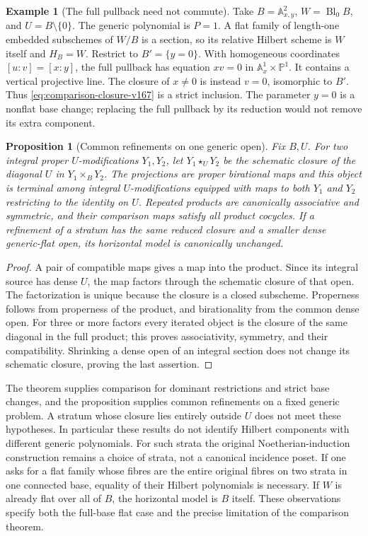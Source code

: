 \documentclass[11pt,reqno]{amsart}
\numberwithin{equation}{section}
\newtheorem{proposition}[theorem]{Proposition}
\theoremstyle{definition}\newtheorem{definition}[theorem]{Definition}
\newtheorem{example}[theorem]{Example}
\theoremstyle{remark}\newtheorem{remark}[theorem]{Remark}
\newcommand{\Pj}{\mathbb P}\newcommand{\A}{\mathbb A}
\begin{document}
\begin{example}[The full pullback need not commute]
\label{ex:basechange-v167}
Take $B=\A^2_{x,y}$, $W=\operatorname{Bl}_0B$, and
$U=B\setminus\{0\}$. The generic polynomial is $P=1$.
A flat family of length-one embedded subschemes of $W/B$ is a
section, so its relative Hilbert scheme is $W$ itself and
$H_B=W$. Restrict to $B'=\{y=0\}$. With homogeneous coordinates
$[u:v]=[x:y]$, the full pullback has equation $xv=0$ in
$\A^1_x\times\Pj^1$. It contains a vertical projective line.
The closure of $x\ne0$ is instead $v=0$, isomorphic to $B'$.
Thus \eqref{eq:comparison-closure-v167} is a strict inclusion.
The parameter $y=0$ is a nonflat base change; replacing the full
pullback by its reduction would not remove its extra component.
\end{example}

\begin{proposition}[Common refinements on one generic open]
\label{prop:refinement-v167}
Fix $B,U$. For two integral proper $U$-modifications $Y_1,Y_2$,
let $Y_1\star_UY_2$ be the schematic closure of the diagonal
$U$ in $Y_1\times_BY_2$. The projections are proper birational
maps and this object is terminal among integral $U$-modifications
equipped with maps to both $Y_1$ and $Y_2$ restricting to the
identity on $U$. Repeated products are canonically associative
and symmetric, and their comparison maps satisfy all product
cocycles. If a refinement of a stratum has the same reduced
closure and a smaller dense generic-flat open, its horizontal
model is canonically unchanged.
\end{proposition}
\begin{proof}
A pair of compatible maps gives a map into the product. Since its
integral source has dense $U$, the map factors through the
schematic closure of that open. The factorization is unique
because the closure is a closed subscheme. Properness follows
from properness of the product, and birationality from the common
dense open. For three or more factors every iterated object is
the closure of the same diagonal in the full product; this proves
associativity, symmetry, and their compatibility. Shrinking a
dense open of an integral section does not change its schematic
closure, proving the last assertion.
\end{proof}

The theorem supplies comparison for dominant restrictions and
strict base changes, and the proposition supplies common
refinements on a fixed generic problem. A stratum whose closure
lies entirely outside $U$ does not meet these hypotheses. In
particular these results do not identify Hilbert components with
different generic polynomials. For such strata the original
Noetherian-induction construction remains a choice of strata,
not a canonical incidence poset. If one asks for a flat family
whose fibres are the entire original fibres on two strata in one
connected base, equality of their Hilbert polynomials is necessary.
If $W$ is already flat over all of $B$, the horizontal model is
$B$ itself. These observations specify both the full-base flat
case and the precise limitation of the comparison theorem.
\end{document}
